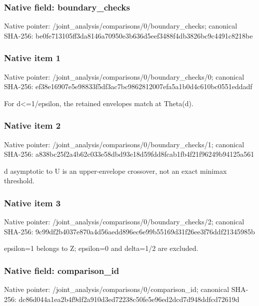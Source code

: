 \documentclass[10pt,a4paper]{article}
\begin{document}
\subsubsection{Native field: boundary\_\allowbreak{}checks}
Native pointer: /joint\_\allowbreak{}analysis/comparisons/0/boundary\_\allowbreak{}checks; canonical SHA-256: be0fe713105ff3da8146a70950e3b636d5eef3488f4db3826bc9c4491c8218be

\subsubsection{Native item 1}
Native pointer: /joint\_\allowbreak{}analysis/comparisons/0/boundary\_\allowbreak{}checks/0; canonical SHA-256: ef38e16907e5e98833f5df3ac7bc9862812007efa5a1b0d4c610bc0551eddadf

\begingroup\raggedright\sloppy For d<=\allowbreak{}1/\allowbreak{}epsilon,\allowbreak{} the retained envelopes match at Theta(d).\par\endgroup

\subsubsection{Native item 2}
Native pointer: /joint\_\allowbreak{}analysis/comparisons/0/boundary\_\allowbreak{}checks/1; canonical SHA-256: a838bc25f2a4b62c033e58dbd93e18d59fdd8fcab1fb4f21f96249b94125a561

\begingroup\raggedright\sloppy d asymptotic to U is an upper-envelope crossover,\allowbreak{} not an exact minimax threshold.\par\endgroup

\subsubsection{Native item 3}
Native pointer: /joint\_\allowbreak{}analysis/comparisons/0/boundary\_\allowbreak{}checks/2; canonical SHA-256: 9c99df2b4037e870a4d56aedd896ec6e99b55169d31f26ee3f76ddf21345985b

\begingroup\raggedright\sloppy epsilon=\allowbreak{}1 belongs to Z;\allowbreak{} epsilon=\allowbreak{}0 and delta=\allowbreak{}1/\allowbreak{}2 are excluded.\par\endgroup

\subsubsection{Native field: comparison\_\allowbreak{}id}
Native pointer: /joint\_\allowbreak{}analysis/comparisons/0/comparison\_\allowbreak{}id; canonical SHA-256: dc86d044a1ea2b4f9df2a910d3ed72238c50fe5e96ed2dcd7d948ddfcd72619d
\end{document}

